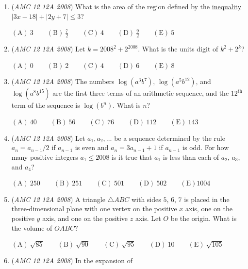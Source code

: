 \begin{enumerate}
 $\mathrm{(A)}\ \frac{1}{16}\qquad\mathrm{(B)}\ \frac{1}{9}\qquad\mathrm{(C)}\ \frac{1}{8}\qquad\mathrm{(D)}\ \frac{1}{6}\qquad\mathrm{(E)}\ \frac{1}{4}$


	\item (\textit{AMC 12 12A 2008}) What is the area of the region defined by the \href{https://artofproblemsolving.com/wiki/index.php?title=Inequality}{inequality} $|3x-18|+|2y+7|\le3$?


 $\mathrm{(A)}\ 3\qquad\mathrm{(B)}\ \frac {7}{2}\qquad\mathrm{(C)}\ 4\qquad\mathrm{(D)}\ \frac{9}{2}\qquad\mathrm{(E)}\ 5$


	\item (\textit{AMC 12 12A 2008}) Let $k={2008}^{2}+{2}^{2008}$. What is the units digit of $k^2+2^k$?


 $\mathrm{(A)}\ 0\qquad\mathrm{(B)}\ 2\qquad\mathrm{(C)}\ 4\qquad\mathrm{(D)}\ 6\qquad\mathrm{(E)}\ 8$


	\item (\textit{AMC 12 12A 2008}) The numbers $\log(a^3b^7)$, $\log(a^5b^{12})$, and $\log(a^8b^{15})$ are the first three terms of an arithmetic sequence, and the $12^\text{th}$ term of the sequence is $\log(b^n)$. What is $n$?


 $\mathrm{(A)}\ 40\qquad\mathrm{(B)}\ 56\qquad\mathrm{(C)}\ 76\qquad\mathrm{(D)}\ 112\qquad\mathrm{(E)}\ 143$


	\item (\textit{AMC 12 12A 2008}) Let $a_1,a_2,\ldots$ be a sequence determined by the rule $a_n=a_{n-1}/2$ if $a_{n-1}$ is even and $a_n=3a_{n-1}+1$ if $a_{n-1}$ is odd. For how many positive integers $a_1 \le 2008$ is it true that $a_1$ is less than each of $a_2$, $a_3$, and $a_4$? 


 $\mathrm{(A)}\ 250\qquad\mathrm{(B)}\ 251\qquad\mathrm{(C)}\ 501\qquad\mathrm{(D)}\ 502\qquad\mathrm{(E)} 1004$


	\item (\textit{AMC 12 12A 2008}) A triangle $\triangle ABC$ with sides $5$, $6$, $7$ is placed in the three-dimensional plane with one vertex on the positive $x$ axis, one on the positive $y$ axis, and one on the positive $z$ axis. Let $O$ be the origin. What is the volume of $OABC$?  


 $\mathrm{(A)}\ \sqrt{85}\qquad\mathrm{(B)}\ \sqrt{90}\qquad\mathrm{(C)}\ \sqrt{95}\qquad\mathrm{(D)}\ 10\qquad\mathrm{(E)}\ \sqrt{105}$


	\item (\textit{AMC 12 12A 2008}) In the expansion of


\end{enumerate}
